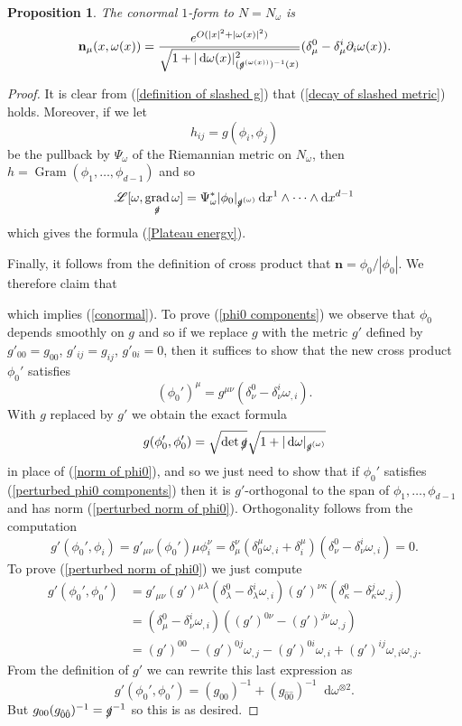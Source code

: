 \documentclass[reqno,12pt,letterpaper]{amsart}
\newcommand*\dif{\mathop{}\!\mathrm{d}}
\DeclareMathOperator{\Gram}{Gram}
\DeclareMathOperator{\grad}{grad}
\newcommand{\Lagrange}{\mathscr L}
\newcommand{\normal}{\mathbf n}
\newtheorem{proposition}[theorem]{Proposition}
\theoremstyle{definition}
\numberwithin{equation}{section}
\begin{document}
\begin{proposition}
The conormal $1$-form to $N = N_\omega$ is
\begin{equation}\label{conormal}
\normal_\mu(x, \omega(x)) = \frac{e^{O(|x|^2 + |\omega(x)|^2)}}{\sqrt{1 + |\dif \omega(x)|^2_{(\slashed g^{(\omega(x))})^{-1}(x)}}} (\delta^0_\mu - \delta^i_\mu \partial_i \omega(x)).
\end{equation}
\end{proposition}
\begin{proof}
It is clear from (\ref{definition of slashed g}) that (\ref{decay of slashed metric}) holds.
Moreover, if we let
$$h_{ij} = g(\phi_i, \phi_j)$$
be the pullback by $\Psi_\omega$ of the Riemannian metric on $N_\omega$, then $h = \Gram(\phi_1, \dots, \phi_{d - 1})$ and so
$$\Lagrange[\omega, \grad_{\slashed g} \omega] = \Psi_\omega^* |\phi_0|_{\slashed g^{(\omega)}} \dif x^1 \wedge \cdots \wedge \dif x^{d - 1}$$
which gives the formula (\ref{Plateau energy}).

Finally, it follows from the definition of cross product that $\normal = \phi_0/|\phi_0|$.
We therefore claim that

which implies (\ref{conormal}). To prove (\ref{phi0 components}) we observe that $\phi_0$ depends smoothly on $g$ and so if we replace $g$ with the metric $g'$ defined by $g'_{00} = g_{00}$, $g'_{ij} = g_{ij}$, $g'_{0i} = 0$, then it suffices to show that the new cross product $\phi_0'$ satisfies
\begin{equation}\label{perturbed phi0 components}
(\phi_0')^\mu = g^{\mu\nu}(\delta_\nu^0 - \delta_\nu^i\omega_{,i}).
\end{equation}
With $g$ replaced by $g'$ we obtain the exact formula
\begin{equation}\label{perturbed norm of phi0}
g(\phi_0', \phi_0') = \sqrt{\det \slashed g} \sqrt{1 + |\dif \omega|_{\slashed g^{(\omega)}}}
\end{equation}
in place of (\ref{norm of phi0}), and so we just need to show that if $\phi_0'$ satisfies (\ref{perturbed phi0 components}) then it is $g'$-orthogonal to the span of $\phi_1, \dots, \phi_{d - 1}$ and has norm (\ref{perturbed norm of phi0}).
Orthogonality follows from the computation
$$g'(\phi_0', \phi_i) = g'_{\mu\nu} (\phi_0')\mu \phi_i^\nu = \delta_\mu^\nu (\delta_0^\mu \omega_{,i} + \delta_i^\mu) (\delta_\nu^0 - \delta_\nu^i \omega_{,i}) = 0.$$
To prove (\ref{perturbed norm of phi0}) we just compute
\begin{align*}
g'(\phi_0', \phi_0')
&= g'_{\mu \nu} (g')^{\mu \lambda}(\delta^0_\lambda - \delta^i_\lambda \omega_{,i}) (g')^{\nu \kappa}(\delta_\kappa^0 - \delta_\kappa^j \omega_{,j})\\
&= (\delta_\mu^0 - \delta_\nu^i \omega_{,i})((g')^{0 \nu} - (g')^{j \nu} \omega_{,j})\\
&= (g')^{00} - (g')^{0j} \omega_{,j} - (g')^{0i} \omega_{,i} + (g')^{ij} \omega_{,i} \omega_{,j}.
\end{align*}
From the definition of $g'$ we can rewrite this last expression as
$$g'(\phi_0', \phi_0') = (g_{00})^{-1} + (g_{\hat 0 \hat 0})^{-1} \dif \omega^{\otimes 2}.$$
But $g_{00} (g_{\hat 0 \hat 0})^{-1} = \slashed g^{-1}$ so this is as desired.
\end{proof}
\end{document}
